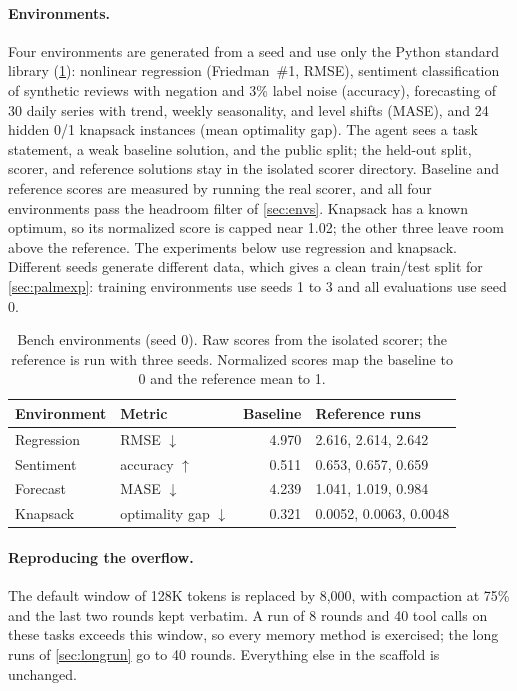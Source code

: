 \documentclass[11pt]{article}
\begin{document}
\paragraph{Environments.}
Four environments are generated from a seed and use only the Python standard library (\cref{tab:bench}): nonlinear regression (Friedman~\#1, RMSE), sentiment classification of synthetic reviews with negation and 3\% label noise (accuracy), forecasting of 30 daily series with trend, weekly seasonality, and level shifts (MASE), and 24 hidden 0/1 knapsack instances (mean optimality gap). The agent sees a task statement, a weak baseline solution, and the public split; the held-out split, scorer, and reference solutions stay in the isolated scorer directory. Baseline and reference scores are measured by running the real scorer, and all four environments pass the headroom filter of \cref{sec:envs}. Knapsack has a known optimum, so its normalized score is capped near 1.02; the other three leave room above the reference. The experiments below use regression and knapsack. Different seeds generate different data, which gives a clean train/test split for \cref{sec:palmexp}: training environments use seeds 1 to 3 and all evaluations use seed 0.

\begin{table}[t]
\centering
\small
\caption{Bench environments (seed 0). Raw scores from the isolated scorer; the reference is run with three seeds. Normalized scores map the baseline to 0 and the reference mean to 1.}
\label{tab:bench}
\begin{tabular}{@{}l l r l@{}}
\toprule
Environment & Metric & Baseline & Reference runs \\
\midrule
Regression & RMSE $\downarrow$ & 4.970 & 2.616, 2.614, 2.642 \\
Sentiment & accuracy $\uparrow$ & 0.511 & 0.653, 0.657, 0.659 \\
Forecast & MASE $\downarrow$ & 4.239 & 1.041, 1.019, 0.984 \\
Knapsack & optimality gap $\downarrow$ & 0.321 & 0.0052, 0.0063, 0.0048 \\
\bottomrule
\end{tabular}
\end{table}

\paragraph{Reproducing the overflow.}
The default window of 128K tokens is replaced by 8,000, with compaction at 75\% and the last two rounds kept verbatim. A run of 8 rounds and 40 tool calls on these tasks exceeds this window, so every memory method is exercised; the long runs of \cref{sec:longrun} go to 40 rounds. Everything else in the scaffold is unchanged.
\end{document}
